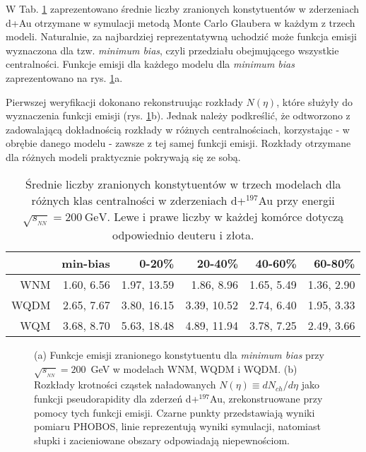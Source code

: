 \documentclass[a4paper,12pt]{article}
\begin{document}
W Tab. \ref{table:d-Au0} zaprezentowano średnie liczby zranionych konstytuentów w zderzeniach d+Au otrzymane w symulacji metodą Monte Carlo Glaubera w każdym z trzech modeli. Naturalnie, za najbardziej reprezentatywną uchodzić może funkcja emisji wyznaczona dla tzw. \textit{minimum bias}, czyli przedziału obejmującego wszystkie centralności. Funkcje emisji dla każdego modelu dla \textit{minimum bias} zaprezentowano na rys. \ref{fig:F0}a.

Pierwszej weryfikacji dokonano rekonstruując rozkłady $N(\eta)$, które służyły do wyznaczenia funkcji emisji (rys. \ref{fig:F0}b). Jednak należy podkreślić, że odtworzono z zadowalającą dokładnością rozkłady w różnych centralnościach, korzystając - w obrębie danego modelu - zawsze z tej samej funkcji emisji. Rozkłady otrzymane dla różnych modeli praktycznie pokrywają się ze sobą.


\begin{table}[H]\centering
\begin{tabular}{|r|r|r|r|r|r|} \hline
 & min-bias & 0-20\% & 20-40\% & 40-60\% & 60-80\% \\ \hline
WNM  & 1.60, 6.56 & 1.97, 13.59 & 1.86,  8.96 & 1.65, 5.49 & 1.36, 2.90 \\ \hline
WQDM & 2.65, 7.67 & 3.80, 16.15 & 3.39, 10.52 & 2.74, 6.40 & 1.95, 3.33 \\ \hline
WQM  & 3.68, 8.70 & 5.63, 18.48 & 4.89, 11.94 & 3.78, 7.25 & 2.49, 3.66 \\ \hline
\end{tabular}
\caption{Średnie liczby zranionych konstytuentów w trzech modelach dla różnych klas centralności w zderzeniach d+$^{197}$Au przy energii $\sqrt{s_{_{NN}}} = 200~\text{GeV}$. Lewe i prawe liczby w każdej komórce dotyczą odpowiednio deuteru i złota.}\label{table:d-Au0}
\end{table}
\begin{figure}[h!]
\begin{center}
%
\hspace{0.3cm}
%
\caption{(a) Funkcje emisji zranionego konstytuentu dla \textit{minimum bias} przy $\sqrt{s_{_{NN}}}=200$~GeV w modelach WNM, WQDM i WQDM. (b) Rozkłady krotności cząstek naładowanych $N(\eta)\equiv dN_{ch}/d\eta$ jako funkcji pseudorapidity dla zderzeń d+$^{197}$Au, zrekonstruowane przy pomocy tych funkcji emisji. Czarne punkty przedstawiają wyniki pomiaru PHOBOS, linie reprezentują wyniki symulacji, natomiast słupki i zacieniowane obszary odpowiadają niepewnościom.}\label{fig:F0}
\end{center}
\end{figure}
\end{document}
